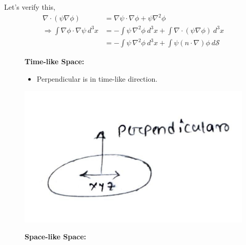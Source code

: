 \documentclass[14pt]{article} %
\begin{document}
\begin{tcolorbox}[ title=Verifying Dirichlet condition]
Let's verify this,
\begin{align*}
\nabla \cdot (\psi \nabla \phi) &= \nabla \psi \cdot \nabla \phi + \psi \nabla^2 \phi \\
\Rightarrow \int \nabla \phi \cdot \nabla \psi~d^3x &= -\int \psi \, \nabla^2 \phi~d^3 x +\int\nabla \cdot(\psi \nabla \phi)~ d^3 x \\
&=  -\int \psi \, \nabla^2 \phi~d^3 x +\int \psi (n\cdot\nabla) \phi~ d \mathcal{S}
\end{align*}
\end{tcolorbox}
\begin{tcolorbox}[ title=Post-class discussions]
\begin{figure}[H]
    \centering
    \vspace{-0.7cm}
    \begin{minipage}[t]{0.6\textwidth}
    \vspace{-2.5cm}
        \textbf{Time-like Space:}
        \begin{itemize}
            \item Perpendicular is in time-like direction.
        \end{itemize}
    \end{minipage}%
    \hfill
    \begin{minipage}[t]{0.35\textwidth}
        \includegraphics[width=\linewidth]{figures/L5_5.jpeg}
    \end{minipage}
    \begin{minipage}[t]{0.6\textwidth}
    \vspace{-3.5cm}
        \textbf{Space-like Space:}

\end{minipage}
\end{figure}
\end{tcolorbox}
\end{document}

